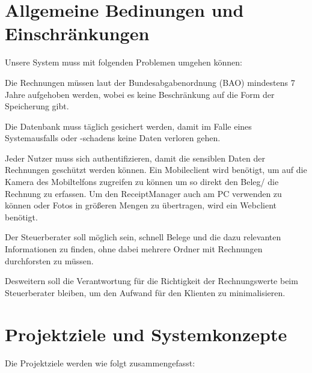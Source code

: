 \documentclass[12pt]{article}
\theoremstyle{definition}
\newcommand*{\skippingparagraph}{\par\vspace{\baselineskip}\noindent}
\begin{document}
\section{Allgemeine Bedinungen und Einschränkungen}
Unsere System muss mit folgenden Problemen umgehen können: 
\skippingparagraph
Die Rechnungen müssen laut der Bundesabgabenordnung (BAO) mindestens 7 Jahre aufgehoben werden, wobei es keine Beschränkung auf die Form der Speicherung gibt.
\skippingparagraph
Die Datenbank muss täglich gesichert werden, damit im Falle eines Systemausfalls oder -schadens keine Daten verloren gehen.
\skippingparagraph
Jeder Nutzer muss sich authentifizieren, damit die sensiblen Daten der Rechnungen geschützt werden können.
Ein Mobileclient wird benötigt, um auf die Kamera des Mobiltelfons zugreifen zu können um so direkt den Beleg/ die Rechnung zu erfassen. Um den ReceiptManager auch am PC verwenden zu können oder Fotos in größeren Mengen zu übertragen, wird ein Webclient benötigt.
\skippingparagraph
Der Steuerberater soll möglich sein, schnell Belege und die dazu relevanten Informationen zu finden, ohne dabei mehrere Ordner mit Rechnungen durchforsten zu müssen.
\skippingparagraph
Desweitern soll die Verantwortung für die Richtigkeit der Rechnungswerte beim Steuerberater bleiben, um den Aufwand für den Klienten zu minimalisieren.
\par
\pagebreak

\section{Projektziele und Systemkonzepte}
Die Projektziele werden wie folgt zusammengefasst:
\end{document}
